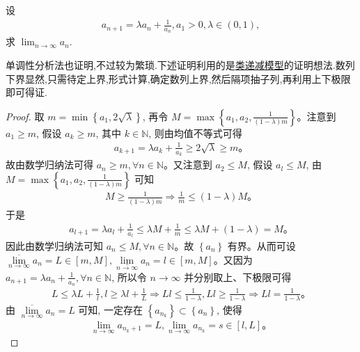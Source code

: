 \documentclass[lang=cn,newtx,10pt,scheme=chinese]{../Template/elegantbook}
\begin{document}
\begin{example}
设
\begin{align*}
a_{n+1} = \lambda a_n + \frac{1}{a_n}, a_1 > 0, \lambda \in (0,1),
\end{align*}
求 $\lim_{n \to \infty} a_n$.
\end{example}
\begin{note}
单调性分析法也证明,不过较为繁琐.下述证明利用的是\hyperref[Basis of Analytics-example:类递减模型]{类递减模型}的证明想法.数列下界显然,只需待定上界,形式计算,确定数列上界,然后隔项抽子列,再利用上下极限即可得证.
\end{note}
\begin{proof}
取 $m=\min \left\{ a_1,2\sqrt{\lambda} \right\}$, 再令 $M=\max \left\{ a_1,a_2,\frac{1}{\left( 1-\lambda \right) m} \right\}$。注意到 $a_1\geqslant m$, 假设 $a_k\geqslant m$, 其中 $k\in \mathbb{N}$, 则由均值不等式可得
\begin{align*}
a_{k+1}=\lambda a_k+\frac{1}{a_k}\geqslant 2\sqrt{\lambda}\geqslant m。
\end{align*}
故由数学归纳法可得 $a_n\geqslant m,\forall n\in \mathbb{N}$。又注意到 $a_2\leqslant M$, 假设 $a_l\leqslant M$, 由 $M=\max \left\{ a_1,a_2,\frac{1}{\left( 1-\lambda \right) m} \right\}$ 可知
\begin{align*}
M\geqslant \frac{1}{\left( 1-\lambda \right) m}\Rightarrow \frac{1}{m}\leqslant \left( 1-\lambda \right) M。
\end{align*}
于是
\begin{align*}
a_{l+1}=\lambda a_l+\frac{1}{a_l}\leqslant \lambda M+\frac{1}{m}\leqslant \lambda M+\left( 1-\lambda \right) =M。
\end{align*}
因此由数学归纳法可知 $a_n\leqslant M,\forall n\in \mathbb{N}$。故 $\left\{ a_n \right\}$ 有界。从而可设 $\underset{n\rightarrow \infty}{\overline{\lim }}a_n=L\in \left[ m,M \right] ,\underset{n\rightarrow \infty}{\underline{\lim }}a_n=l\in \left[ m,M \right]$。又因为 $a_{n+1}=\lambda a_n+\frac{1}{a_n},\forall n\in \mathbb{N}$, 所以令 $n\rightarrow \infty$ 并分别取上、下极限可得
\begin{align*}
L\leqslant \lambda L+\frac{1}{l},l\geqslant \lambda l+\frac{1}{L}\Rightarrow Ll\leqslant \frac{1}{1-\lambda},Ll\ge \frac{1}{1-\lambda}\Rightarrow Ll=\frac{1}{1-\lambda}。
\end{align*}
由 $\underset{n\rightarrow \infty}{\overline{\lim }}a_n=L$ 可知, 一定存在 $\left\{ a_{n_k} \right\} \subset \left\{ a_n \right\}$, 使得
\begin{align*}
\underset{n\rightarrow \infty}{\lim}a_{n_k+1}=L,\underset{n\rightarrow \infty}{\lim}a_{n_k}=s\in \left[ l,L \right]。

\end{align*}
\end{proof}
\end{document}
